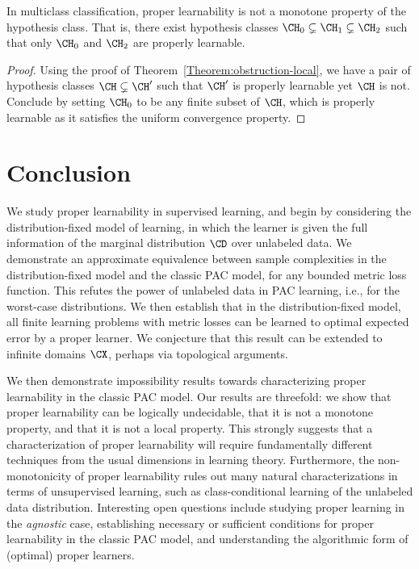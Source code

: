 \documentclass[11pt]{article}
\begin{document}
\begin{theorem}
In multiclass classification, proper learnability is not a monotone property of the hypothesis class. That is, there exist hypothesis classes $\CH_0 \subsetneq \CH_1 \subsetneq \CH_2$ such that only $\CH_0$ and $\CH_2$ are properly learnable. 
\end{theorem}
\begin{proof}
Using the proof of Theorem~\ref{Theorem:obstruction-local}, we have a pair of hypothesis classes $\CH \subsetneq \CH'$ such that $\CH'$ is properly learnable yet $\CH$ is not. Conclude by setting $\CH_0$ to be any finite subset of $\CH$, which is properly learnable as it satisfies the uniform convergence property. 
\end{proof}

\section{Conclusion}

We study proper learnability in supervised learning, and begin by considering the distribution-fixed model of learning, in which the learner is given the full information of the marginal distribution $\CD$ over unlabeled data. We demonstrate an approximate equivalence between sample complexities in the distribution-fixed model and the classic PAC model, for any bounded metric loss function. This refutes the power of unlabeled data in PAC learning, i.e., for the worst-case distributions. We then establish that in the distribution-fixed model, all finite learning problems with metric losses can be learned to optimal expected error by a proper learner. We conjecture that this result can be extended to infinite domains $\CX$, perhaps via topological arguments. 

We then demonstrate impossibility results towards characterizing proper learnability in the classic PAC model. Our results are threefold: we show that proper learnability can be logically undecidable, that it is not a monotone property, and that it is not a local property. This strongly suggests that a characterization of proper learnability will require fundamentally different techniques from the usual dimensions in learning theory. Furthermore, the non-monotonicity of proper learnability rules out many natural characterizations in terms of unsupervised learning, such as class-conditional learning of the unlabeled data distribution. Interesting open questions include studying proper learning in the \emph{agnostic} case, establishing necessary or sufficient conditions for proper learnability in the classic PAC model, and understanding the algorithmic form of (optimal) proper learners.
\end{document}
